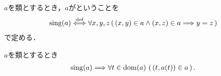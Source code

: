 	\begin{screen}
		\begin{dfn}
			$a$を類とするとき，$a$がということを
			\begin{align}
				\operatorname*{sing} (a) \overset{\mathrm{def}}{\Longleftrightarrow}
				\forall x,y,z\, (\, (x,y) \in a \wedge (x,z) \in a \Longrightarrow y=z\, )
			\end{align}
			で定める．
		\end{dfn}
	\end{screen}
	
	\begin{screen}
		\begin{thm}[値とは要素となる順序対の片割れである]\label{thm:value_and_ordered_pair}
			$a$を類とするとき
			\begin{align}
				\operatorname*{sing} (a) \Longrightarrow \forall t \in \operatorname*{dom} (a)\, \left(\, (t,a(t)) \in a\, \right).
			\end{align}
		\end{thm}
	\end{screen}
	
